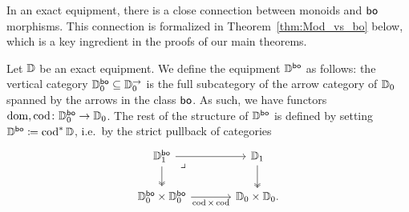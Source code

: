 \documentclass[11pt,oneside,article]{memoir}
\begin{document}
In an exact equipment, there is a close connection between monoids and $\mathsf{bo}$ morphisms. This
connection is formalized in Theorem~\ref{thm:Mod_vs_bo} below, which is a key ingredient in the
proofs of our main theorems.

\begin{definition}
   Let $\mathbb{D}$ be an exact equipment. We define the equipment $\mathbb{D}^{\mathsf{bo}}$ as follows: the
   vertical category $\mathbb{D}_0^{\mathsf{bo}}\subseteq\mathbb{D}_0^{\rightarrow}$ is the full subcategory of the arrow category of
   $\mathbb{D}_0$ spanned by the arrows in the class $\mathsf{bo}$. As such, we have functors $\operatorname{dom},\operatorname{cod}\colon\mathbb{D}_0^{\mathsf{bo}}\to\mathbb{D}_0$. The rest of the structure of $\mathbb{D}^{\mathsf{bo}}$ is defined by
   setting $\mathbb{D}^{\mathsf{bo}}\coloneqq\operatorname{cod}^*\mathbb{D}$, i.e.\ by the strict pullback of categories
   \[ \begin{tikzcd}[column sep=large]
      \dcat{D}_1^{\bo} \ar[r] \ar[d, two heads] \ar[dr,phantom,"\lrcorner" very near start]
         & \dcat{D}_1 \ar[d, two heads] \\
      \dcat{D}_0^{\bo}\times\dcat{D}_0^{\bo} \ar[r,"\cod\times\cod"']
         & \dcat{D}_0\times\dcat{D}_0.
   \end{tikzcd} \]
\end{definition}
\end{document}
